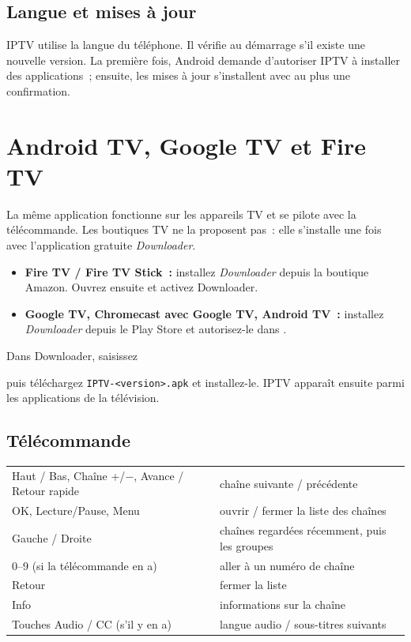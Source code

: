 \subsection{Langue et mises à jour}
IPTV utilise la langue du téléphone. Il vérifie au démarrage s'il existe une
nouvelle version. La première fois, Android demande d'autoriser IPTV à
installer des applications~; ensuite, les mises à jour s'installent avec au
plus une confirmation.

\section{Android TV, Google TV et Fire TV}

La même application fonctionne sur les appareils TV et se pilote avec la
télécommande. Les boutiques TV ne la proposent pas~: elle s'installe une
fois avec l'application gratuite \emph{Downloader}.

\begin{itemize}
  \item \textbf{Fire TV / Fire TV Stick~:} installez \emph{Downloader} depuis
        la boutique Amazon. Ouvrez ensuite  et activez
        Downloader.
  \item \textbf{Google TV, Chromecast avec Google TV, Android TV~:} installez
        \emph{Downloader} depuis le Play Store et autorisez-le dans
        .
\end{itemize}
Dans Downloader, saisissez
\begin{center}
  \download
\end{center}
puis téléchargez \texttt{IPTV-\textless version\textgreater.apk} et
installez-le. IPTV apparaît ensuite parmi les applications de la télévision.

\subsection{Télécommande}
\begin{xltabular}{\linewidth}{@{}KX@{}}
Haut / Bas, Chaîne +/$-$, Avance / Retour rapide & chaîne suivante / précédente \\
OK, Lecture/Pause, Menu & ouvrir / fermer la liste des chaînes \\
Gauche / Droite & chaînes regardées récemment, puis les groupes \\
0--9 (si la télécommande en a) & aller à un numéro de chaîne \\
Retour & fermer la liste \\
Info & informations sur la chaîne \\
Touches Audio / CC (s'il y en a) & langue audio / sous-titres suivants \\
\bottomrule
\end{xltabular}

